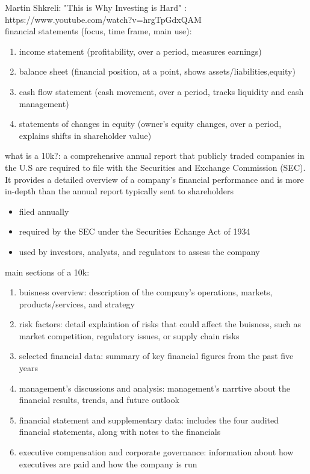 \documentclass{article}
\begin{document}
Martin Shkreli: "This is Why Investing is Hard" : https://www.youtube.com/watch?v=hrgTpGdxQAM \\

financial statements (focus, time frame, main use):
	\begin{enumerate}
	\item income statement (profitability, over a period, measures earnings)
	\item balance sheet (financial position, at a point, shows assets/liabilities,equity)
	\item cash flow statement (cash movement, over a period, tracks liquidity and cash management)
	\item statements of changes in equity (owner's equity changes, over a period, explains shifts in shareholder value)
\end{enumerate}

what is a 10k?:
	a comprehensive annual report that publicly traded companies in the U.S are required to file with the Securities and Exchange Commission (SEC). It provides a detailed overview of a company's financial performance and is more in-depth than the annual report typically sent to shareholders
\begin{itemize}
	\item filed annually
	\item required by the SEC under the Securities Echange Act of 1934
	\item used by investors, analysts, and regulators to assess the company
\end{itemize}

main sections of a 10k:
\begin{enumerate}
	\item buisness overview: description of the company's operations, markets, products/services, and strategy
	\item risk factors: detail explaintion of risks that could affect the buisness, such as market competition, regulatory issues, or supply chain risks
	\item selected financial data: summary of key financial figures from the past five years
	\item management's discussions and analysis: management's narrtive about the financial results, trends, and future outlook
	\item financial statement and supplementary data: includes the four audited financial statements, along with notes to the financials
	\item executive compensation and corporate governance: information about how executives are paid and how the company is run
\end{enumerate}
\end{document}
